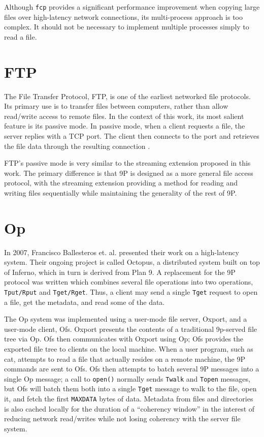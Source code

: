 \documentclass[11pt,american]{report}
\begin{document}
Although {\tt fcp} provides a significant performance improvement when copying large files over high-latency network connections, its multi-process approach is too complex. It should not be necessary to implement multiple processes simply to read a file.

\section{FTP}
The File Transfer Protocol, FTP, is one of the earliest networked file protocols. Its primary use is to transfer files between computers, rather than allow read/write access to remote files. In the context of this work, its most salient feature is its passive mode. In passive mode, when a client requests a file, the server replies with a TCP port. The client then connects to the port and retrieves the file data through the resulting connection \cite{FTPrfc}.

FTP's passive mode is very similar to the streaming extension proposed in this work. The primary difference is that 9P is designed as a more general file access protocol, with the streaming extension providing a method for reading and writing files sequentially while maintaining the generality of the rest of 9P.

\section{Op}
In 2007, Francisco Ballesteros et. al. \cite{Op} presented their work on a high-latency system. Their ongoing project is called Octopus, a distributed system built on top of Inferno, which in turn is derived from Plan 9. A replacement for the 9P protocol was written which combines several file operations into two operations, {\tt Tput/Rput} and {\tt Tget/Rget}. Thus, a client may send a single {\tt Tget} request to open a file, get the metadata, and read some of the data.

The Op system was implemented using a user-mode file server, Oxport, and a user-mode client, Ofs. Oxport presents the contents of a traditional 9p-served file tree via Op. Ofs then communicates with Oxport using Op; Ofs provides the exported file tree to clients on the local machine. When a user program, such as cat, attempts to read a file that actually resides on a remote machine, the 9P commands are sent to Ofs. Ofs then attempts to batch several 9P messages into a single Op message; a call to {\tt open()} normally sends {\tt Twalk} and {\tt Topen} messages, but Ofs will batch them both into a single {\tt Tget} message to walk to the file, open it, and fetch the first {\tt MAXDATA} bytes of data. Metadata from files and directories is also cached locally for the duration of a ``coherency window'' in the interest of reducing network read/writes while not losing coherency with the server file system.
\end{document}
